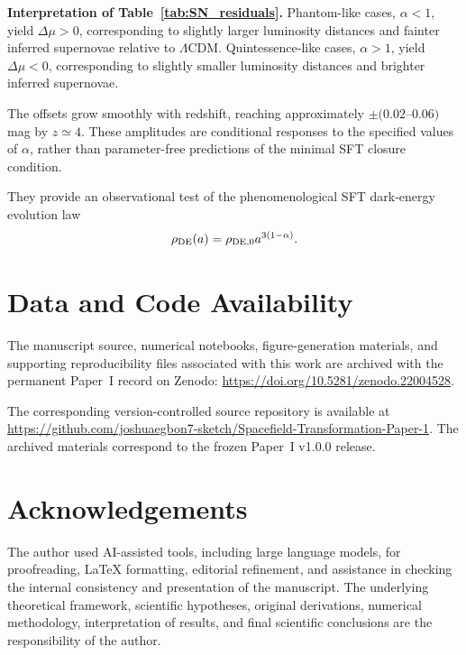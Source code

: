\documentclass[12pt]{article}
\begin{document}
\noindent\textbf{Interpretation of Table~\ref{tab:SN_residuals}.}
Phantom-like cases, $\alpha<1$, yield $\Delta\mu>0$, corresponding to
slightly larger luminosity distances and fainter inferred supernovae
relative to $\Lambda$CDM. Quintessence-like cases, $\alpha>1$, yield
$\Delta\mu<0$, corresponding to slightly smaller luminosity distances
and brighter inferred supernovae.

The offsets grow smoothly with redshift, reaching approximately
$\pm(0.02$--$0.06)$ mag by $z\simeq4$. These amplitudes are conditional
responses to the specified values of $\alpha$, rather than parameter-free
predictions of the minimal SFT closure condition.

They provide an observational test of the phenomenological SFT
dark-energy evolution law
\[
\rho_{\rm DE}(a)
=
\rho_{{\rm DE},0}a^{3(1-\alpha)}.
\]


\section*{Data and Code Availability}

The manuscript source, numerical notebooks, figure-generation materials,
and supporting reproducibility files associated with this work are archived
with the permanent Paper~I record on Zenodo:
\url{https://doi.org/10.5281/zenodo.22004528}.

The corresponding version-controlled source repository is available at
\url{https://github.com/joshuaegbon7-sketch/Spacefield-Transformation-Paper-1}.
The archived materials correspond to the frozen Paper~I v1.0.0 release.


\section*{Acknowledgements}

The author used AI-assisted tools, including large language models,
for proofreading, LaTeX formatting, editorial refinement, and assistance
in checking the internal consistency and presentation of the manuscript.
The underlying theoretical framework, scientific hypotheses, original
derivations, numerical methodology, interpretation of results, and final
scientific conclusions are the responsibility of the author.
\end{document}
